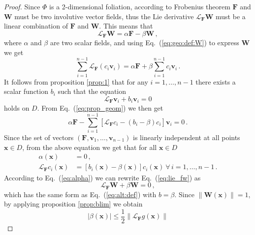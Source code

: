 \documentclass[10pt,a4paper]{amsart}
\newcommand{\vect}[1]{\boldsymbol{#1}}
\begin{document}
\begin{proof}
Since $\Phi$ is a 2-dimensional foliation, 
according to Frobenius theorem $\vect{F}$ and $\vect{W}$ must be
  two involutive vector fields, thus the Lie derivative
  $\mathcal{L}_{\vect{F}}\vect{W}$ must be a linear combination of
  $\vect{F}$ and $\vect{W}$. This means that
  \begin{equation}\label{eq:lie_fw}
    \mathcal{L}_{\vect{F}}\vect{W} = \alpha \vect{F} - \beta \vect{W}\,,
  \end{equation}
  where $\alpha$ and $\beta$ are two scalar fields, and
using Eq.~(\ref{eq:geo:def:W}) to express $\vect{W}$ we get
  \begin{equation}\label{eq:prop_geom}
    \sum_{i=1}^{n-1} \mathcal{L}_{\vect{F}}(c_i \vect{v}_i) =
    \alpha \vect{F} + \beta \sum_{i=1}^{n-1} c_i \vect{v}_i\,.
  \end{equation}
It follows from proposition \ref{prop:1} that for any $i=1, \dots, n-1$
there exists a scalar function $b_i$ such that the equation
 \begin{equation}
    \mathcal{L}_{\vect{F}} \vect{v}_i + b_i \vect v_i = 0 
    \label{eq:alt:defi}
  \end{equation}  
holds on $D$. From Eq.~(\ref{eq:prop_geom}) we then get
  \begin{equation}\label{eq:foliation_c}
\alpha \vect{F} -\sum_{i=1}^{n-1}\left[\mathcal{L}_{\vect{F}}c_i-
(b_i-\beta)c_i \right] \vect{v}_i = 0    \,.
  \end{equation}
Since the set of vectors $\left(\vect{F},\vect{v}_1, \dots, 
\vect{v}_{n-1}\right)$ is
linearly independent at all points $\vect{x}\in D$, 
from the above equation we get that for all $\vect{x} \in D$
\begin{align}
\alpha(\vect{x})&=0 \,, \label{eq:alpha}\\
 \mathcal{L}_{\vect{F}}c_i(\vect{x})&=\left[b_i(\vect{x})-
\beta(\vect{x})\right]c_i(\vect{x})\ \forall\,i=1,\dots, n-1\,. \label{eq:coeffci}
\end{align}
According to Eq.~(\ref{eq:alpha}) we can rewrite Eq.~(\ref{eq:lie_fw}) as
 \begin{equation}\label{eq:lie_fw1}
    \mathcal{L}_{\vect{F}}\vect{W} +\beta \vect{W}=0\,,
  \end{equation}
which has the same form as Eq.~(\ref{eq:alt:def}) with $b=\beta$.
Since $\lVert \vect{W}(\vect{x})\rVert =1$, by applying proposition 
\ref{prop:blim} we obtain
\begin{equation}%
\lvert \beta(\vect{x})\rvert \leq \frac 12 \lVert 
\mathcal{L}_{\vect{F}} g(\vect{x}) \rVert

\end{equation}
\end{proof}
\end{document}
